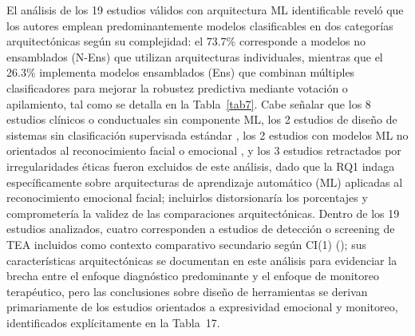 \documentclass[ASNA,twocolumn]{USG}
\begin{document}
	El análisis de los 19 estudios válidos con arquitectura ML identificable reveló
	que los autores emplean predominantemente modelos clasificables en dos categorías
	arquitectónicas según su complejidad: el 73.7\% corresponde a modelos no
	ensamblados (N-Ens) que utilizan arquitecturas individuales, mientras que el
	26.3\% implementa modelos ensamblados (Ens) que combinan múltiples clasificadores
	para mejorar la robustez predictiva mediante votación o apilamiento, tal como se
	detalla en la Tabla~\ref{tab7}. Cabe señalar que los 8 estudios clínicos o
	conductuales sin componente ML, los 2 estudios de diseño de sistemas sin
	clasificación supervisada estándar \cite{Levy2024,Almeida2019}, los 2 estudios con
	modelos ML no orientados al reconocimiento facial o emocional
	\cite{Alsubai2025,OSullivan2023}, y los 3 estudios retractados por irregularidades
	éticas fueron excluidos de este análisis, dado que la RQ1 indaga específicamente
	sobre arquitecturas de aprendizaje automático (ML) aplicadas al reconocimiento
	emocional facial; incluirlos distorsionaría los porcentajes y comprometería la
	validez de las comparaciones arquitectónicas. Dentro de los 19 estudios
	analizados, cuatro corresponden a estudios de detección o screening de TEA
	incluidos como contexto comparativo secundario según CI(1)
	(\cite{Shaik2025,Ahmad2024,Radocaj2025,Alam2025}); sus características
	arquitectónicas se documentan en este análisis para evidenciar la brecha entre el
	enfoque diagnóstico predominante y el enfoque de monitoreo terapéutico, pero las
	conclusiones sobre diseño de herramientas se derivan primariamente de los estudios
	orientados a expresividad emocional y monitoreo, identificados explícitamente en
	la Tabla~17.
	
\end{document}
